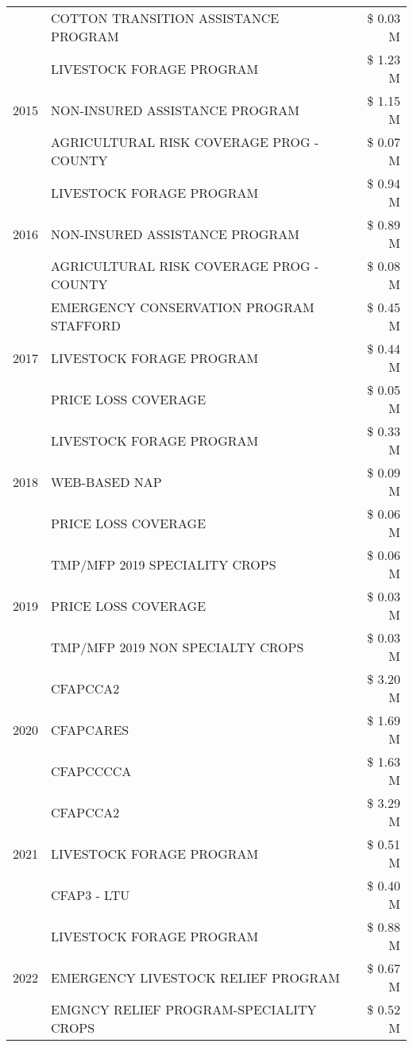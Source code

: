 \begin{tabular}{llr}
 & COTTON TRANSITION ASSISTANCE PROGRAM & \$ 0.03 M \\
\cline{1-3}
\multirow[t]{3}{*}{2015} & LIVESTOCK FORAGE PROGRAM & \$ 1.23 M \\
 & NON-INSURED ASSISTANCE PROGRAM & \$ 1.15 M \\
 & AGRICULTURAL RISK COVERAGE PROG - COUNTY & \$ 0.07 M \\
\cline{1-3}
\multirow[t]{3}{*}{2016} & LIVESTOCK FORAGE PROGRAM & \$ 0.94 M \\
 & NON-INSURED ASSISTANCE PROGRAM & \$ 0.89 M \\
 & AGRICULTURAL RISK COVERAGE PROG - COUNTY & \$ 0.08 M \\
\cline{1-3}
\multirow[t]{3}{*}{2017} & EMERGENCY CONSERVATION PROGRAM STAFFORD & \$ 0.45 M \\
 & LIVESTOCK FORAGE PROGRAM & \$ 0.44 M \\
 & PRICE LOSS COVERAGE & \$ 0.05 M \\
\cline{1-3}
\multirow[t]{3}{*}{2018} & LIVESTOCK FORAGE PROGRAM & \$ 0.33 M \\
 & WEB-BASED NAP & \$ 0.09 M \\
 & PRICE LOSS COVERAGE & \$ 0.06 M \\
\cline{1-3}
\multirow[t]{3}{*}{2019} & TMP/MFP 2019 SPECIALITY CROPS & \$ 0.06 M \\
 & PRICE LOSS COVERAGE & \$ 0.03 M \\
 & TMP/MFP 2019 NON SPECIALTY CROPS & \$ 0.03 M \\
\cline{1-3}
\multirow[t]{3}{*}{2020} & CFAPCCA2 & \$ 3.20 M \\
 & CFAPCARES & \$ 1.69 M \\
 & CFAPCCCCA & \$ 1.63 M \\
\cline{1-3}
\multirow[t]{3}{*}{2021} & CFAPCCA2 & \$ 3.29 M \\
 & LIVESTOCK FORAGE PROGRAM & \$ 0.51 M \\
 & CFAP3 - LTU & \$ 0.40 M \\
\cline{1-3}
\multirow[t]{3}{*}{2022} & LIVESTOCK FORAGE PROGRAM & \$ 0.88 M \\
 & EMERGENCY LIVESTOCK RELIEF PROGRAM & \$ 0.67 M \\
 & EMGNCY RELIEF PROGRAM-SPECIALITY CROPS & \$ 0.52 M \\
\cline{1-3}
\bottomrule
\end{tabular}
